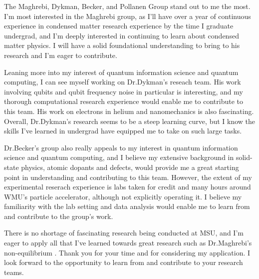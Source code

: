 \documentclass[11pt]{article}
\newcommand{\schoolabbr}{MSU}
\begin{document}
The Maghrebi, Dykman, Becker, and Pollanen Group stand out to me the most. I'm most interested in the Maghrebi group, as I'll have over a year of continuous experience in condensed matter research experience by the time I graduate undergrad, and I'm deeply interested in continuing to learn about condensed matter physics. I will have a solid foundational understanding to bring to his research and I'm eager to contribute.

Leaning more into my interest of quantum information science and quantum computing, I can see myself working on Dr.\@ Dykman's reseach team. His work involving qubits and qubit frequency noise in particular is interesting, and my thorough computational research experience would enable me to contribute to this team. His work on electrons in helium and nanomechanics is also fascinating. Overall, Dr.\@ Dykman's research seems to be a steep learning curve, but I know the skills I've learned in undergrad have equipped me to take on such large tasks.

Dr.\@ Becker's group also really appeals to my interest in quantum information science and quantum computing, and I believe my extensive background in solid-state physics, atomic dopants and defects, would provide me a great starting point in understanding and contributing to this team. However, the extent of my experimental reserach experience is labs taken for credit and many hours around WMU's particle accelerator, although not explicitly operating it. I believe my familiarity with the lab setting and data analysis would enable me to learn from and contribute to the group's work. 

There is no shortage of fascinating research being conducted at \schoolabbr{}, and I'm eager to apply all that I've learned towards great research such as Dr.\@ Maghrebi's non-equilibrium . Thank you for your time and for considering my application. I look forward to the opportunity to learn from and contribute to your research teams.
\end{document}
